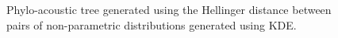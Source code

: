 \documentclass[pdftex,11pt,a4paper]{article}
\theoremstyle{definition}
\theoremstyle{remark}
\begin{document}
\begin{figure}
\noindent{}
    \caption{Phylo-acoustic tree generated using the Hellinger distance between pairs of non-parametric distributions generated using KDE.}
    \label{fig:kdehellinger}
\end{figure}
\end{document}
